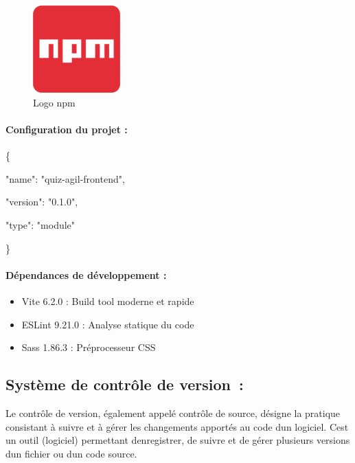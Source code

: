 \documentclass[12pt,a4paper,twoside,openright]{report}
\begin{document}
\begin{figure}[H]
\centering
\includegraphics[width=0.3\textwidth]{latex_media/media/image28.png}
\caption{Logo npm}
\label{fig:logo-npm}
\end{figure}

\hypertarget{configuration-du-projet-1}{%
\paragraph{Configuration du projet :}\label{configuration-du-projet-1}}

\{

"name": "quiz-agil-frontend",

"version": "0.1.0",

"type": "module"

\}

\hypertarget{duxe9pendances-de-duxe9veloppement}{%
\paragraph{\texorpdfstring{\textbf{Dépendances de développement
:}}{Dépendances de développement :}}\label{duxe9pendances-de-duxe9veloppement}}

\begin{itemize}
\item
  Vite 6.2.0 : Build tool moderne et rapide
\item
  ESLint 9.21.0 : Analyse statique du code
\item
  Sass 1.86.3 : Préprocesseur CSS
\end{itemize}

\hypertarget{systuxe8me-de-contruxf4le-de-version}{%
\subsection{Système de contrôle de
version~:}\label{systuxe8me-de-contruxf4le-de-version}}

Le contrôle de version, également appelé contrôle de source, désigne la
pratique consistant à suivre et à gérer les changements apportés au code
d\textquotesingle un logiciel. C\textquotesingle est un outil (logiciel)
permettant d\textquotesingle enregistrer, de suivre et de gérer
plusieurs versions d\textquotesingle un fichier ou d\textquotesingle un
code source.
\end{document}
